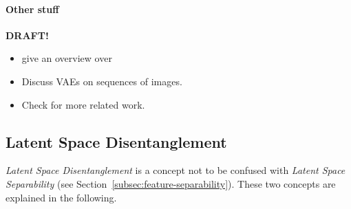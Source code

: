 \paragraph{Other stuff}
\textbf{DRAFT!}
\begin{itemize}
    \item \citet{tschannen2018recent} give an overview over 
    \item Discuss VAEs on sequences of images.
    \item Check \citet{pidhorskyi2020adversarial} for more related work.
\end{itemize}

\subsection{Latent Space Disentanglement}\label{subsec:feature-disentanglement}
\textit{Latent Space Disentanglement} is a concept not to be confused with \textit{Latent Space Separability} (see Section~\ref{subsec:feature-separability}).
These two concepts are explained in the following.


